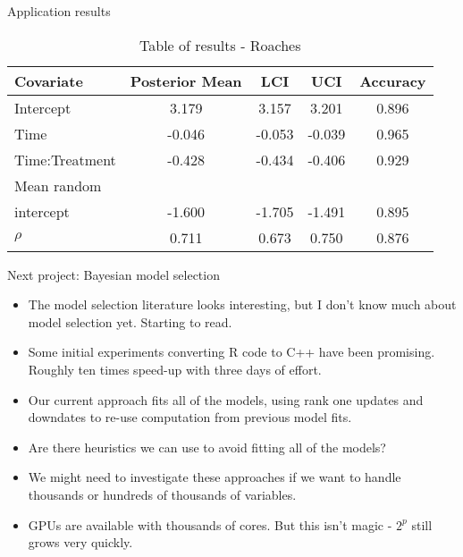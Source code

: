 \documentclass{beamer}
\begin{document}
\begin{frame}{Application results}
\begin{table}
\label{tab:application_roaches}
\caption{Table of results - Roaches}
\begin{tabular}{|l|cccc|}
\hline
Covariate & Posterior Mean & LCI &  UCI & Accuracy \\
\hline
Intercept & 3.179 & 3.157 & 3.201 & 0.896 \\
Time & -0.046 & -0.053 & -0.039 & 0.965 \\
Time:Treatment & -0.428 & -0.434 & -0.406 & 0.929 \\
Mean random\\  intercept & -1.600 & -1.705 & -1.491 & 0.895 \\
$\rho$ & 0.711 & 0.673 & 0.750 & 0.876 \\
\hline
\end{tabular}
\end{table}
\end{frame}

\begin{frame}{Next project: Bayesian model selection}
\begin{itemize}
\item The model selection literature looks interesting, but I don't know much about model selection yet.
			Starting to read.
\item Some initial experiments converting R code to C++ have been promising. Roughly ten times speed-up
			with three days of effort.
\item Our current approach fits all of the models, using rank one updates and
			downdates to re-use computation from previous model fits.
\item Are there heuristics we can use to avoid fitting all of the models?
\item We might need to investigate these approaches if we want to handle thousands or hundreds of thousands
			of variables.
\item GPUs are available with thousands of cores. But this isn't magic - $2^p$ still grows very quickly.
\end{itemize}
\end{frame}
\end{document}
